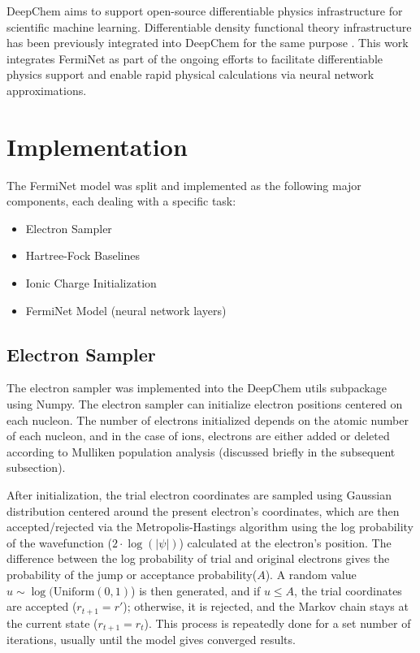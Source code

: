 \documentclass[letterpaper]{article} %
\begin{document}
DeepChem aims to support open-source differentiable physics \cite{ramsundar2021differentiable} infrastructure for scientific machine learning. Differentiable density functional theory infrastructure has been previously integrated into DeepChem for the same purpose \cite{vidhyadhiraja2023open}. This work integrates FermiNet \cite{pfau2020ferminet} as part of the ongoing efforts to facilitate differentiable physics support and enable rapid physical calculations via neural network approximations.


\section{Implementation}
The FermiNet model was split and implemented as the following major components, each dealing with a specific task:
\begin{itemize}
\item Electron Sampler
\item Hartree-Fock Baselines
\item Ionic Charge Initialization 
\item FermiNet Model (neural network layers)
\end{itemize}

\subsection{Electron Sampler}
The electron sampler was implemented into the DeepChem utils subpackage using Numpy. The electron sampler can initialize electron positions centered on each nucleon. The number of electrons initialized depends on the atomic number of each nucleon, and in the case of ions, electrons are either added or deleted according to Mulliken population analysis (discussed briefly in the subsequent subsection).

After initialization, the trial electron coordinates are sampled using Gaussian distribution centered around the present electron's coordinates, which are then accepted/rejected via the Metropolis-Hastings algorithm using the log probability of the wavefunction ($2 \cdot \log(|\psi|)$) calculated at the electron's position. The difference between the log probability of trial and original electrons gives the probability of the jump or acceptance probability($A$). A random value \(u \sim \log(\mathrm{Uniform}(0, 1)\)) is then generated, and if \(u \leq A\), the trial coordinates are accepted (\(r_{t+1} = r'\)); otherwise, it is rejected, and the Markov chain stays at the current state (\(r_{t+1} = r_t\)). This process is repeatedly done for a set number of iterations, usually until the model gives converged results.
\end{document}
